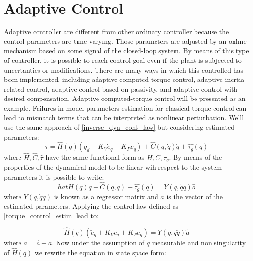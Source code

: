 \section{Adaptive Control}

Adaptive controller are different from other ordinary controller because the control parameters are time varying. Those parameters are adjusted by an online mechanism based on some signal of the closed-loop system. By means of this type of controller, it is possible to reach control goal even if the plant is subjected to uncertanties or modifications. There are many ways in which this controlled has been implemented, including adaptive computed-torque control, adaptive inertia-related control, adaptive control based on passivity, and adaptive control with desired
compensation. Adaptive computed-torque control will be presented as an example. Failures in model parameters estimation for classical torque control can lead to mismatch terms that can be interpreted as nonlinear perturbation.
We'll use the same approach of \ref{inverse_dyn_cont_law} but considering estimated parameters:
\begin{equation}
	\tau=\hat{H}(q)(\ddot{q}_d+K_V\dot{e}_q+K_Pe_q)+\hat{C}(q,\dot{q})\dot{q}+\hat{\tau_g}(q)
	\label{torque_control_estim}
\end{equation}
where $\hat{H},\hat{C},\hat{\tau}$ have the same functional form as $H,C,\tau_g$. By means of the properties of the dynamical model to be linear wih respect to the system parameters it is possible to write:
\begin{equation}
	hat{H}(q)\ddot{q}+\hat{C}(q,\dot{q})+\hat{\tau_g}(q)=Y(q,\dot{q}\ddot{q})\hat{a}
\end{equation}
where $Y(q,\dot{q}\ddot{q})$ is known as a regressor matrix and $a$ is the vector of the estimated parameters. Applying the control law defined as \ref{torque_control_estim} lead to:

\begin{equation}
	\hat{H}(q)(\ddot{e}_q+K_V\dot{e}_q+K_Pe_q)=Y(q,\dot{q}\ddot{q})\tilde{a}
\end{equation} 
where $\tilde{a}=\hat{a}-a$. Now under the assumption of $\ddot{q}$ measurable and non singularity of $\hat{H}(q)$ we rewrite the equation in state space form: 

